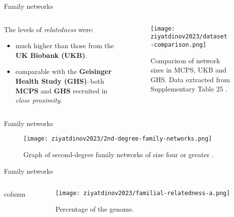 \begin{frame}{Family networks}
    \begin{columns}
        \begin{column}{0.5\textwidth}

            The levels of \textit{relatedness} were:
            \begin{itemize}
                \item much higher than those from the \textbf{UK Biobank (UKB)}.
                \item comparable with the \textbf{Geisinger Health Study (GHS)}--both \textbf{MCPS} and \textbf{GHS} recruited in \textit{close proximity}.
            \end{itemize}
        \end{column}

        \begin{column}{0.5\textwidth}
            \begin{figure}[htpb]
                \centering
                \texttt{[image: ziyatdinov2023/dataset-comparison.png]}
                \caption{Comparison of network sizes in MCPS, UKB and GHS. Data extracted from Supplementary Table 25 \parencite{ziyatdinov2023}.}
                \label{fig:label}
            \end{figure}
        \end{column}
    \end{columns}
\end{frame}

\begin{frame}[t]{Family networks}

    \begin{figure}[htpb]
        \centering
        \texttt{[image: ziyatdinov2023/2nd-degree-family-networks.png]}
        \caption{Graph of second-degree family networks of size four or greater \parencite{ziyatdinov2023}.}
        \label{fig:2nd-degree-megaplot}
    \end{figure}

\end{frame}

\begin{frame}{Family networks}

\begin{columns}
    \begin{column}{0.45\textwidth}
        column
    \end{column}
    \begin{column}{0.45\textwidth}
        \begin{figure}[htpb]
        \centering
        \texttt{[image: ziyatdinov2023/familial-relatedness-a.png]}
        \caption{Percentage of the genome.}
        \label{fig:ibd-genome-percentage}
        \end{figure}
    \end{column}
\end{columns}

\end{frame}